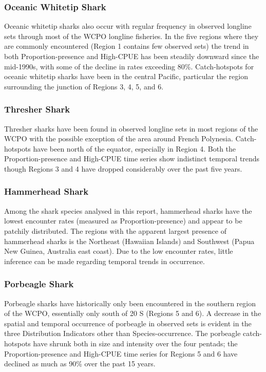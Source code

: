 \documentclass[12pt]{SCreport}
\begin{document}
 \subsubsection{Oceanic Whitetip Shark}
 Oceanic whitetip sharks also occur with regular frequency in observed longline sets through most of the WCPO longline fisheries.  In the five regions where they are commonly encountered (Region 1 contains few observed sets) the trend in both Proportion-presence and High-CPUE has been steadily downward since the mid-1990s, with some of the decline in rates exceeding 80\%.  Catch-hotspots for oceanic whitetip sharks have been in the central Pacific, particular the region surrounding the junction of Regions 3, 4, 5, and 6.

 \subsubsection{Thresher Shark}
 Thresher sharks have been found in observed longline sets in most regions of the WCPO with the possible exception of the area around French Polynesia. Catch-hotspots have been north of the equator, especially in Region 4. Both the Proportion-presence and High-CPUE time series show indistinct temporal trends though Regions 3 and 4 have dropped considerably over the past five years.

 \subsubsection{Hammerhead Shark}
 Among the shark species analysed in this report, hammerhead sharks have the lowest encounter rates (measured as Proportion-presence) and appear to be patchily distributed.  The regions with the apparent largest presence of hammerhead sharks is the Northeast (Hawaiian Islands) and Southwest (Papua New Guinea, Australia east coast).  Due to the low encounter rates, little inference can be made regarding temporal trends in occurrence.
         
 \subsubsection{Porbeagle Shark}
 Porbeagle sharks have historically only been encountered in the southern region of the WCPO, essentially only south of 20 \degree S (Regions 5 and 6).  A decrease in the spatial and temporal occurrence of porbeagle in observed sets is evident in the three Distribution Indicators other than Species-occurrence.  The porbeagle catch-hotspots have shrunk both in size and intensity over the four pentads; the Proportion-presence and High-CPUE time series for Regions 5 and 6 have declined as much as 90\% over the past 15 years.
 
\end{document}
